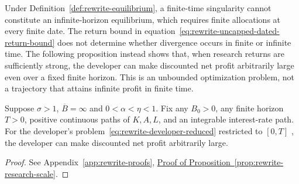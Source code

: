 Under Definition~\ref{def:rewrite-equilibrium}, a finite-time singularity
cannot constitute an infinite-horizon equilibrium, which requires finite
allocations at every finite date. The return bound in
equation~\eqref{eq:rewrite-uncapped-dated-return-bound} does not determine
whether divergence occurs in finite or infinite time. The following
proposition instead shows that, when research returns are
sufficiently strong, the developer can make discounted net profit arbitrarily
large even over a fixed finite horizon. This is an unbounded optimization
problem, not a trajectory that attains infinite profit in finite time.


\begin{proposition}
\label{prop:rewrite-research-scale}
Suppose $\sigma>1$, $\overline B=\infty$ and $0<\alpha <\eta<1$.
Fix any $B_0>0$, any finite horizon $T>0$, positive continuous paths of
$K,A,L$, and an integrable interest-rate path. For the developer's
problem~\eqref{eq:rewrite-developer-reduced} restricted to $[0,T]$%
, the developer can make discounted net profit arbitrarily large.
\end{proposition}
\begin{proof}
See Appendix~\ref{app:rewrite-proofs},
\hyperref[proof:rewrite-research-scale]{Proof of
Proposition~\ref*{prop:rewrite-research-scale}}.
\end{proof}


